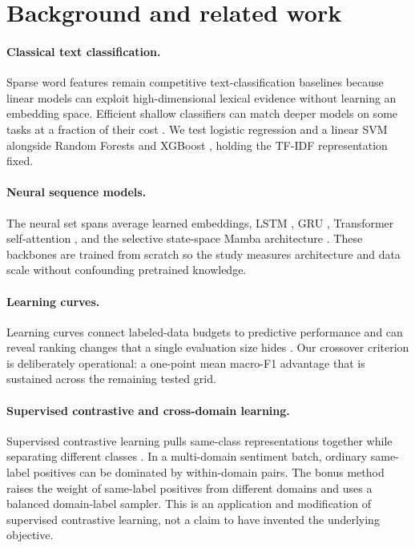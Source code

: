 \section{Background and related work}

\paragraph{Classical text classification.}
Sparse word features remain competitive text-classification baselines because linear models can exploit high-dimensional lexical evidence without learning an embedding space. Efficient shallow classifiers can match deeper models on some tasks at a fraction of their cost \citep{joulin2017bag}. We test logistic regression and a linear SVM alongside Random Forests \citep{breiman2001random} and XGBoost \citep{chen2016xgboost}, holding the TF-IDF representation fixed.

\paragraph{Neural sequence models.}
The neural set spans average learned embeddings, LSTM \citep{hochreiter1997long}, GRU \citep{cho2014learning}, Transformer self-attention \citep{vaswani2017attention}, and the selective state-space Mamba architecture \citep{gu2023mamba}. These backbones are trained from scratch so the study measures architecture and data scale without confounding pretrained knowledge.

\paragraph{Learning curves.}
Learning curves connect labeled-data budgets to predictive performance and can reveal ranking changes that a single evaluation size hides \citep{kolachina2012prediction}. Our crossover criterion is deliberately operational: a one-point mean macro-F1 advantage that is sustained across the remaining tested grid.

\paragraph{Supervised contrastive and cross-domain learning.}
Supervised contrastive learning pulls same-class representations together while separating different classes \citep{khosla2020supervised}. In a multi-domain sentiment batch, ordinary same-label positives can be dominated by within-domain pairs. The bonus method raises the weight of same-label positives from different domains and uses a balanced domain-label sampler. This is an application and modification of supervised contrastive learning, not a claim to have invented the underlying objective.
